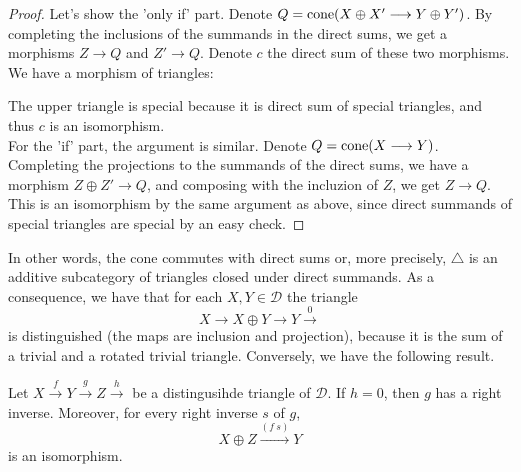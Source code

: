 \begin{proof}
Let's show the 'only if' part. Denote $Q=\textnormal{cone}(X \oplus X' \longrightarrow Y \oplus Y')$. By completing the inclusions of the summands in the direct sums, we get a morphisms $Z \longrightarrow Q$ and $Z' \longrightarrow Q$. Denote $c$ the direct sum of these two morphisms. We have a morphism of triangles: 
\begin{center}
\end{center}
The upper triangle is special because it is direct sum of special triangles, and thus $c$ is an isomorphism. \\
For the 'if' part, the argument is similar. Denote $Q=\textnormal{cone}(X \longrightarrow Y)$. Completing the projections to the summands of the direct sums, we have a morphism $Z \oplus Z' \longrightarrow Q$, and composing with the incluzion of $Z$, we get $Z \longrightarrow Q$. This is an isomorphism by the same argument as above, since direct summands of special triangles are special by an easy check. 
\end{proof}

In other words, the cone commutes with direct sums or, more precisely, $\bigtriangleup$ is an additive subcategory of triangles closed under direct summands. As a consequence, we have that for each $X,Y \in \mathscr{D}$ the triangle $$X \longrightarrow X \oplus Y \longrightarrow Y \overset{0}{\longrightarrow} $$ is distinguished (the maps are inclusion and projection), because it is the sum of a trivial and a rotated trivial triangle. Conversely, we have the following result. 

\begin{prop}\label{d}
Let $X \overset{f}{\longrightarrow} Y \overset{g}{\longrightarrow} Z \overset{h}{\longrightarrow}$ be a distingusihde triangle of $\mathscr{D}$. If $h=0$, then $g$ has a right inverse. Moreover, for every right inverse $s$ of $g$, $$X \oplus Z \overset{(f \ s)}{\longrightarrow} Y$$ is an isomorphism. 
\end{prop}

